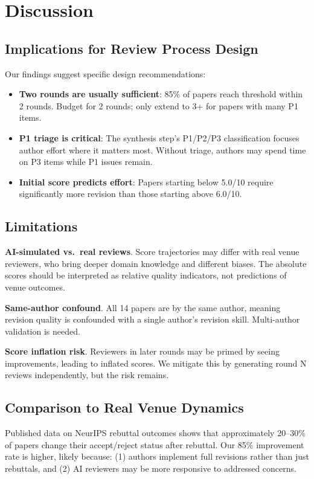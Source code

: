 \section{Discussion}

\subsection{Implications for Review Process Design}

Our findings suggest specific design recommendations:
\begin{itemize}
    \item \textbf{Two rounds are usually sufficient}: 85\% of papers reach threshold within 2 rounds. Budget for 2 rounds; only extend to 3+ for papers with many P1 items.
    \item \textbf{P1 triage is critical}: The synthesis step's P1/P2/P3 classification focuses author effort where it matters most. Without triage, authors may spend time on P3 items while P1 issues remain.
    \item \textbf{Initial score predicts effort}: Papers starting below 5.0/10 require significantly more revision than those starting above 6.0/10.
\end{itemize}

\subsection{Limitations}

\textbf{AI-simulated vs.\ real reviews}. Score trajectories may differ with real venue reviewers, who bring deeper domain knowledge and different biases. The absolute scores should be interpreted as relative quality indicators, not predictions of venue outcomes.

\textbf{Same-author confound}. All 14 papers are by the same author, meaning revision quality is confounded with a single author's revision skill. Multi-author validation is needed.

\textbf{Score inflation risk}. Reviewers in later rounds may be primed by seeing improvements, leading to inflated scores. We mitigate this by generating round N reviews independently, but the risk remains.

\subsection{Comparison to Real Venue Dynamics}

Published data on NeurIPS rebuttal outcomes shows that approximately 20--30\% of papers change their accept/reject status after rebuttal. Our 85\% improvement rate is higher, likely because: (1) authors implement full revisions rather than just rebuttals, and (2) AI reviewers may be more responsive to addressed concerns.
